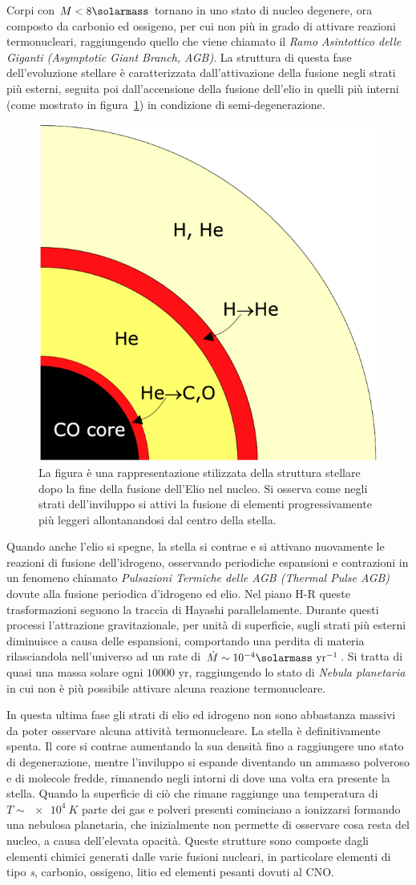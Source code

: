 Corpi con $M < 8\si{\solarmass}$ tornano in uno stato di nucleo degenere, ora composto da carbonio ed ossigeno, per cui non più in grado di attivare reazioni termonucleari, raggiungendo quello che viene chiamato il \textit{Ramo Asintottico delle Giganti (Asymptotic Giant Branch, AGB)}. La struttura di questa fase dell'evoluzione stellare è caratterizzata dall'attivazione della fusione negli strati più esterni, seguita poi dall'accensione della fusione dell'elio in quelli più interni (come mostrato in figura~\ref{fig:AGB}) in condizione di semi-degenerazione.
\begin{figure}
    \centering
    \includegraphics[width = 0.3 \textwidth]{immagini/AGB.png}
    \caption{La figura è una rappresentazione stilizzata della struttura stellare dopo la fine della fusione dell'Elio nel nucleo. Si osserva come negli strati dell'inviluppo si attivi la fusione di elementi progressivamente più leggeri allontanandosi dal centro della stella.}\label{fig:AGB}
\end{figure}
Quando anche l'elio si spegne, la stella si contrae e si attivano nuovamente le reazioni di fusione dell'idrogeno, osservando periodiche espansioni e contrazioni in un fenomeno chiamato \textit{Pulsazioni Termiche delle AGB (Thermal Pulse AGB)} dovute alla fusione periodica d'idrogeno ed elio. Nel piano H-R queste trasformazioni seguono la traccia di Hayashi parallelamente. Durante questi processi l'attrazione gravitazionale, per unità di superficie, sugli strati più esterni diminuisce a causa delle espansioni, comportando una perdita di materia rilasciandola nell'universo ad un rate di $\dot{M} \sim 10^{-4} \si{\solarmass} \mbox{ yr}^{-1}$. Si tratta di quasi una massa solare ogni $10000 \mbox{ yr}$, raggiungendo lo stato di \textit{Nebula planetaria} in cui non è più possibile attivare alcuna reazione termonucleare.

In questa ultima fase gli strati di elio ed idrogeno non sono abbastanza massivi da poter osservare alcuna attività termonucleare. La stella è definitivamente spenta. Il core si contrae aumentando la sua densità fino a raggiungere uno stato di degenerazione, mentre l'inviluppo si espande diventando un ammasso polveroso e di molecole fredde, rimanendo negli intorni di dove una volta era presente la stella. Quando la superficie di ciò che rimane raggiunge una temperatura di $T \sim \SI{e4}{K}$ parte dei gas e polveri presenti cominciano a ionizzarsi formando una nebulosa planetaria, che inizialmente non permette di osservare cosa resta del nucleo, a causa dell'elevata opacità. Queste strutture sono composte dagli elementi chimici generati dalle varie fusioni nucleari, in particolare elementi di tipo \textit{s}, carbonio, ossigeno, litio ed elementi pesanti dovuti al CNO.